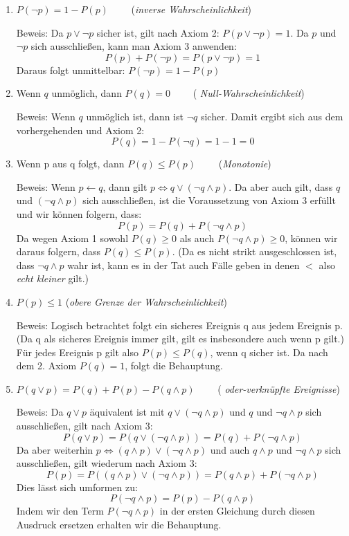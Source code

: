 \begin{enumerate}
  \item $P(\neg p) = 1 - P(p) \qquad$ ({\em inverse Wahrscheinlichkeit})

  {\small Beweis: Da $p \vee \neg p$ sicher ist, gilt nach Axiom 2: 
  $P(p \vee \neg p) = 1$. Da $p$ und $\neg p$ sich ausschließen, kann man Axiom
  3 anwenden: \[P(p) + P(\neg p) = P(p \vee \neg p) = 1\] Daraus folgt
  unmittelbar: $P(\neg p) = 1 - P(p) \qquad$}
  
  \item Wenn $q$ unmöglich, dann $P(q) = 0 \qquad$ ({\em
  Null-Wahrscheinlichkeit})

  {\small Beweis: Wenn $q$ unmöglich ist, dann ist $\neg q$ sicher. Damit
  ergibt sich aus dem vorhergehenden und Axiom 2: 
  \[P(q) = 1 - P(\neg q) = 1 - 1 = 0\]}
  
  \item Wenn p aus q folgt, dann $P(q) \leq P(p) \qquad$ ({\em Monotonie})
  
  {\small Beweis: Wenn $p \leftarrow q$, dann gilt $p \Leftrightarrow q \vee (\neg q \wedge
  p)$. Da aber auch gilt, dass $q$ und $(\neg q \wedge p)$ sich ausschließen,
  ist die Voraussetzung von Axiom 3 erfüllt und wir können folgern, dass:
  \[P(p) = P(q) + P(\neg q \wedge p)\] Da wegen Axiom 1 sowohl $P(q) \geq 0$
  als auch $P(\neg q \wedge p) \geq 0$, können wir daraus folgern, dass $P(q)
  \leq P(p)$. (Da es nicht strikt ausgeschlossen ist, dass $\neg q \wedge p$
  wahr ist, kann es in der Tat auch Fälle geben in denen $<$ also {\em echt
  kleiner} gilt.)}

  \item $P(p) \leq 1$ \qquad ({\em obere Grenze der Wahrscheinlichkeit})
  
  {\small Beweis: Logisch betrachtet folgt ein sicheres Ereignis q aus jedem
  Ereignis p. (Da q als sicheres Ereignis immer gilt, gilt es insbesondere auch
  wenn p gilt.) Für jedes Ereignis p gilt also $P(p) \leq P(q)$, wenn q sicher
  ist. Da nach dem 2. Axiom $P(q) = 1$, folgt die Behauptung.}

  \item $P(q \vee p) = P(q) + P(p) - P(q \wedge p) \qquad$ ({\em
  oder-verknüpfte Ereignisse})
  
  {\small Beweis: Da $q \vee p$ äquivalent ist mit $q \vee (\neg q \wedge p)$
  und $q$ und $\neg q \wedge p$ sich ausschließen, gilt nach Axiom 3: 
  \[P(q \vee p) = P(q \vee (\neg q \wedge p)) = P(q) + P(\neg q \wedge p)\]
  Da aber weiterhin $p \Leftrightarrow (q \wedge p) \vee (\neg q \wedge p)$ und auch $q
  \wedge p$ und $\neg q \wedge p$ sich ausschließen, gilt wiederum nach Axiom 3:
  \[P(p) = P((q \wedge p) \vee (\neg q \wedge p)) = P(q \wedge p) + P(\neg q
  \wedge p)\]
  Dies lässt sich umformen zu:
  \[P(\neg q \wedge p) = P(p) - P(q \wedge p)\]
  Indem wir den Term $P(\neg q \wedge p)$ in der ersten Gleichung durch diesen
  Ausdruck ersetzen erhalten wir die Behauptung.}
\end{enumerate}

